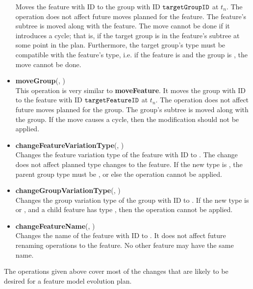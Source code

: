 \begin{itemize}
      Moves the feature with ID  to the group with ID $\texttt{targetGroupID}$ at $t_n$. The operation does not affect future moves planned for the feature. The feature's subtree is moved along with the feature. The move cannot be done if it introduces a cycle; that is, if the target group is in the feature's subtree at some point in the plan. Furthermore, the target group's type must be compatible with the feature's type, i.e. if the feature is \mandatory{} and the group is \optional{}, the move cannot be done.
  \item \textbf{moveGroup}(, ) \\
    This operation is very similar to \textbf{moveFeature}. It moves the group with ID  to the feature with ID $\texttt{targetFeatureID}$ at $t_n$. The operation does not affect future moves planned for the group. The group's subtree is moved along with the group. If the move causes a cycle, then the modification should not be applied.
  \item \textbf{changeFeatureVariationType}(, ) \\
    Changes the feature variation type of the feature with ID  to . The change does not affect planned type changes to the feature. If the new type is \mandatory{}, the parent group type must be \andtype{}, or else the operation cannot be applied.
  \item \textbf{changeGroupVariationType}(, )\\
    Changes the group variation type of the group with ID  to . If the new type is \ortype{} or \xortype{}, and a child feature has type \mandatory{}, then the operation cannot be applied. 
  \item \textbf{changeFeatureName}(, )\\
    Changes the name of the feature with ID  to . It does not affect future renaming operations to the feature. No other feature may have the same name.
\end{itemize}

The operations given above cover most of the changes that are likely to be desired for a feature model evolution plan.
